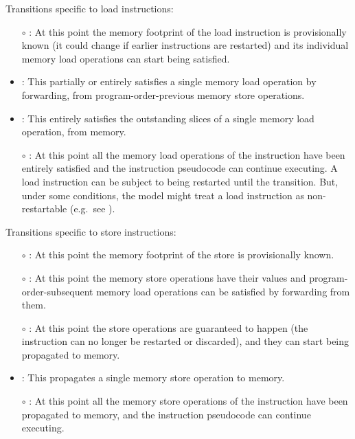 \noindent Transitions specific to load instructions:
\begin{itemize}
\item[$\circ$] : At this point the memory
  footprint of the load instruction is provisionally known (it could change if
  earlier instructions are restarted) and its individual memory load operations can start being satisfied.
\item {}: This partially or entirely
  satisfies a single memory load operation by forwarding, from
  program-order-previous memory store operations.
\item {}: This entirely satisfies the outstanding slices of a single memory load operation, from memory.
\item[$\circ$] : At this point all the memory load operations of the instruction have been entirely satisfied and the instruction pseudocode can continue executing.
A load instruction can be subject to being restarted until the  transition.
But, under some conditions, the model might treat a load instruction as non-restartable (e.g.~see ).
\end{itemize}

\noindent Transitions specific to store instructions:
\begin{itemize}
\item[$\circ$] : At this point the memory footprint of the store is provisionally known.
\item[$\circ$] : At this point the memory store operations have their values and program-order-subsequent memory load operations can be satisfied by forwarding from them.
\item[$\circ$] : At this point the store operations are guaranteed to happen (the instruction can no longer be restarted or discarded), and they can start being propagated to memory.
\item {}: This propagates a single memory store operation to memory.
\item[$\circ$] : At this point all the memory store operations of the instruction have been propagated to memory, and the instruction pseudocode can continue executing.
\end{itemize}

